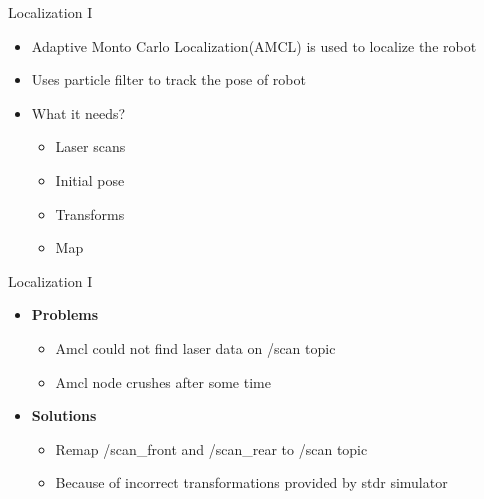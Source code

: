 \begin{frame}{Localization I}
    \begin{itemize}
        \item Adaptive Monto Carlo Localization(AMCL) is used to localize the robot
        \item Uses particle filter to track the pose of robot

        \item What it needs?
        \begin{itemize}
            \item Laser scans
            \item Initial pose
            \item Transforms
            \item Map 
        \end{itemize}
    \end{itemize}
\end{frame}
\begin{frame}{Localization I}
\begin{itemize}
	\item \textbf{Problems}
	\begin{itemize}
		\item Amcl could not find laser data on /scan topic
		\item Amcl node crushes after some time
		
	\end{itemize}
	\item \textbf{Solutions}
	\begin{itemize}
		\item Remap /scan\_front and /scan\_rear to /scan topic
		\item Because of incorrect transformations provided by stdr simulator
		
	\end{itemize}
\end{itemize}
\end{frame}